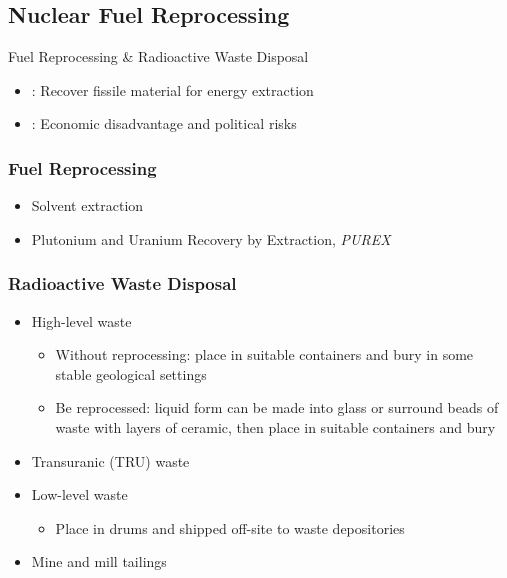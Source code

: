 \subsection{Nuclear Fuel Reprocessing}

Fuel Reprocessing \& Radioactive Waste Disposal

\begin{itemize}
    \item \faGrinBeam[regular]: Recover fissile material for energy extraction
    \item \faGrinBeamSweat[regular]: Economic disadvantage and political risks
\end{itemize}

\subsubsection*{Fuel Reprocessing}

\begin{itemize}
    \item Solvent extraction
    \item Plutonium and Uranium Recovery by Extraction, {\itshape PUREX}
\end{itemize}

\subsubsection*{Radioactive Waste Disposal}

\begin{itemize}
    \item High-level waste
    \begin{itemize}
        \item Without reprocessing: place in suitable containers and bury in some stable geological settings
        \item Be reprocessed: liquid form can be made into glass or surround beads of waste with layers of ceramic, then place in suitable containers and bury
    \end{itemize}
    \item Transuranic (TRU) waste
    \item Low-level waste
    \begin{itemize}
        \item Place in drums and shipped off-site to waste depositories
    \end{itemize}
    \item Mine and mill tailings
\end{itemize}
